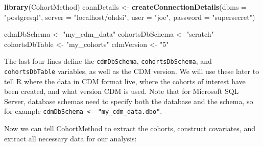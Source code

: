 \documentclass[]{book}
\newenvironment{Shaded}{\begin{snugshade}}{\end{snugshade}}
\newcommand{\KeywordTok}[1]{\textcolor[rgb]{0.13,0.29,0.53}{\textbf{#1}}}
\newcommand{\DataTypeTok}[1]{\textcolor[rgb]{0.13,0.29,0.53}{#1}}
\newcommand{\StringTok}[1]{\textcolor[rgb]{0.31,0.60,0.02}{#1}}
\newcommand{\NormalTok}[1]{#1}
\begin{document}
\begin{Shaded}
\begin{Highlighting}[]
\KeywordTok{library}\NormalTok{(CohortMethod)}
\NormalTok{connDetails <-}\StringTok{ }\KeywordTok{createConnectionDetails}\NormalTok{(}\DataTypeTok{dbms =} \StringTok{"postgresql"}\NormalTok{,}
                                       \DataTypeTok{server =} \StringTok{"localhost/ohdsi"}\NormalTok{,}
                                       \DataTypeTok{user =} \StringTok{"joe"}\NormalTok{,}
                                       \DataTypeTok{password =} \StringTok{"supersecret"}\NormalTok{)}

\NormalTok{cdmDbSchema <-}\StringTok{ "my_cdm_data"}
\NormalTok{cohortsDbSchema <-}\StringTok{ "scratch"}
\NormalTok{cohortsDbTable <-}\StringTok{ "my_cohorts"}
\NormalTok{cdmVersion <-}\StringTok{ "5"}
\end{Highlighting}
\end{Shaded}

The last four lines define the \texttt{cdmDbSchema},
\texttt{cohortsDbSchema}, and \texttt{cohortsDbTable} variables, as well
as the CDM version. We will use these later to tell R where the data in
CDM format live, where the cohorts of interest have been created, and
what version CDM is used. Note that for Microsoft SQL Server, database
schemas need to specify both the database and the schema, so for example
\texttt{cdmDbSchema\ \textless{}-\ "my\_cdm\_data.dbo"}.

Now we can tell CohortMethod to extract the cohorts, construct
covariates, and extract all necessary data for our analysis:
\end{document}

